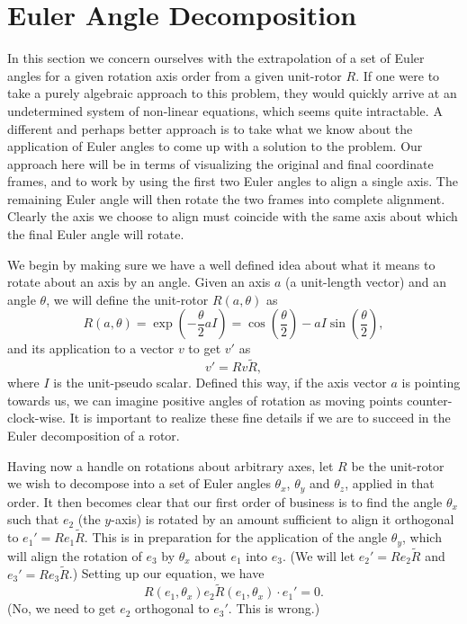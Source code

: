 \documentclass[12pt]{article}
\begin{document}
\section*{Euler Angle Decomposition}

In this section we concern ourselves with the extrapolation of a set of Euler angles for
a given rotation axis order from a given unit-rotor $R$.  If one were to take a purely algebraic
approach to this problem, they would quickly arrive at an undetermined system of non-linear equations,
which seems quite intractable.  A different and perhaps better approach is to take what we know
about the application of Euler angles to come up with a solution to the problem.
Our approach here will be in terms of visualizing the original and final coordinate frames,
and to work by using the first two Euler angles to align a single axis.  The remaining Euler angle
will then rotate the two frames into complete alignment.  Clearly the axis we choose to align must
coincide with the same axis about which the final Euler angle will rotate.

We begin by making sure we have a well defined idea about what it means to rotate
about an axis by an angle.  Given an axis $a$ (a unit-length vector) and an angle $\theta$,
we will define the unit-rotor $R(a,\theta)$ as
\begin{equation*}
R(a,\theta) = \exp\left(-\frac{\theta}{2}aI\right) = \cos\left(\frac{\theta}{2}\right)-aI\sin\left(\frac{\theta}{2}\right),
\end{equation*}
and its application to a vector $v$ to get $v'$ as
\begin{equation*}
v' = Rv\tilde{R},
\end{equation*}
where $I$ is the unit-pseudo scalar.  Defined this way, if the axis vector $a$ is pointing towards us,
we can imagine positive angles of rotation as moving points counter-clock-wise.  It is important to
realize these fine details if we are to succeed in the Euler decomposition of a rotor.

Having now a handle on rotations about arbitrary axes, let $R$ be the unit-rotor we wish to decompose
into a set of Euler angles $\theta_x$, $\theta_y$ and $\theta_z$, applied in that order.  It then becomes
clear that our first order of business is to find the angle $\theta_x$ such that $e_2$ (the $y$-axis) is
rotated by an amount sufficient to align it orthogonal to $e_1'=Re_1\tilde{R}$.  This is in preparation for the application
of the angle $\theta_y$, which will align the rotation of $e_3$ by $\theta_x$ about $e_1$ into $e_3$.
(We will let $e_2'=Re_2\tilde{R}$ and $e_3'=Re_3\tilde{R}$.)
Setting up our equation, we have
\begin{equation*}
R(e_1,\theta_x)e_2\tilde{R}(e_1,\theta_x)\cdot e_1' = 0.
\end{equation*}
(No, we need to get $e_2$ orthogonal to $e_3'$.  This is wrong.)
\end{document}
